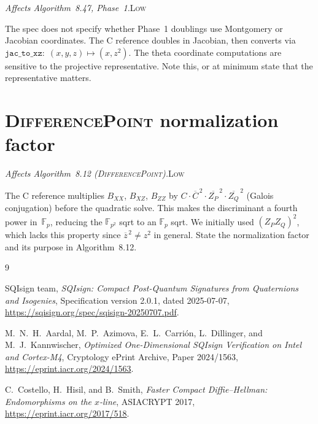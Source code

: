 \documentclass[a4paper,11pt]{article}
\newcommand{\algo}[1]{Algorithm~#1}
\newcommand{\Fp}{\mathbb{F}_p}
\newcommand{\Fpii}{\mathbb{F}_{p^2}}
\newcommand{\low}{\textsc{\color{OliveGreen}Low}}
\newcommand{\finding}[2]{\noindent\textit{#1}\hfill#2\par\smallskip}
\begin{document}
\finding{Affects \algo{8.47}, Phase~1.}{\low}

The spec does not specify whether Phase~1 doublings use Montgomery or
Jacobian coordinates.  The C reference doubles in Jacobian, then converts
via $\texttt{jac\_to\_xz}{:}\; (x,y,z) \mapsto (x, z^2)$.  The theta
coordinate computations are sensitive to the projective representative.
Note this, or at minimum state that the representative matters.

\section{\textsc{DifferencePoint} normalization factor}
\label{sec:difference-normalization}

\finding{Affects \algo{8.12} (\textsc{DifferencePoint}).}{\low}

The C reference multiplies $B_{XX}$, $B_{XZ}$, $B_{ZZ}$ by
$C \cdot \overline{C}^{\,2} \cdot \overline{Z_P}^{\,2} \cdot
\overline{Z_Q}^{\,2}$ (Galois conjugation) before the quadratic solve.
This makes the discriminant a fourth power in~$\Fp$, reducing the
$\Fpii$ sqrt to an $\Fp$ sqrt.  We initially used $(Z_P Z_Q)^2$, which
lacks this property since $\overline{z}^{\,2} \neq z^2$ in general.
State the normalization factor and its purpose in \algo{8.12}.


\begin{thebibliography}{9}

{SQIsign team},
\textit{SQIsign: Compact Post-Quantum Signatures from Quaternions and Isogenies},
Specification version 2.0.1, dated 2025-07-07,
\url{https://sqisign.org/spec/sqisign-20250707.pdf}.

M.~N.~H.~Aardal, M.~P.~Azimova, E.~L.~Carri\'{o}n, L.~Dillinger, and
M.~J.~Kannwischer,
\textit{Optimized One-Dimensional SQIsign Verification on Intel and Cortex-M4},
Cryptology ePrint Archive, Paper 2024/1563,
\url{https://eprint.iacr.org/2024/1563}.

C.~Costello, H.~Hisil, and B.~Smith,
\textit{Faster Compact Diffie--Hellman: Endomorphisms on the $x$-line},
ASIACRYPT 2017,
\url{https://eprint.iacr.org/2017/518}.

\end{thebibliography}

\clearpage
\appendix
\end{document}
